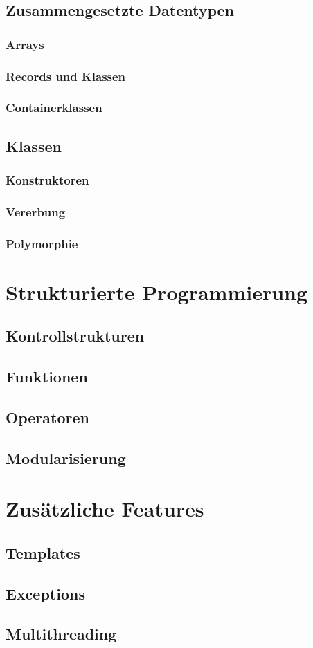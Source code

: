 \documentclass[a4paper]{report}
\begin{document}
\section{Zusammengesetzte Datentypen}
\subsection{Arrays}
\subsection{Records und Klassen}
\subsection{Containerklassen}
\section{Klassen}
\subsection{Konstruktoren}
\subsection{Vererbung}
\subsection{Polymorphie}

\chapter{Strukturierte Programmierung}
\section{Kontrollstrukturen}
\section{Funktionen}
\section{Operatoren}
\section{Modularisierung}

\chapter{Zusätzliche Features}
\section{Templates}
\section{Exceptions}
\section{Multithreading}
\end{document}
